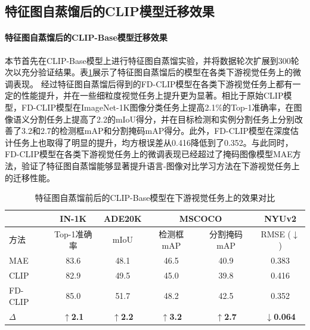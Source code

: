 \subsection{特征图自蒸馏后的CLIP模型迁移效果}
\label{sec:fd-exp-clip}
\paragraph{特征图自蒸馏后的CLIP-Base模型迁移效果} 本节首先在CLIP-Base模型上进行特征图自蒸馏实验，并将数据轮次扩展到300轮次以充分验证结果。表\ref{tab:fd-clip_FD}展示了特征图自蒸馏后的模型在各类下游视觉任务上的微调表现。
经过特征图自蒸馏后得到的FD-CLIP模型在各类下游视觉任务上都有一定的性能提升，并在一些细粒度视觉任务上提升更为显著。相比于原始CLIP模型，FD-CLIP模型在ImageNet-1K图像分类任务上提高2.1\%的Top-1准确率，在图像语义分割任务上提高了2.2的mIoU得分，并在目标检测和实例分割任务上分别改善了3.2和2.7的检测框mAP和分割掩码mAP得分。此外，FD-CLIP模型在深度估计任务上也取得了明显的提升，均方根误差从0.416降低到了0.352。与此同时，FD-CLIP模型在各类下游视觉任务上的微调表现已经超过了掩码图像模型MAE方法，验证了特征图自蒸馏能够显著提升语言-图像对比学习方法在下游视觉任务上的迁移性能。

\begin{table}
\caption{特征图自蒸馏前后的CLIP-Base模型在下游视觉任务上的效果对比
}
\centering
  \begin{tabular}{lccccc}
\toprule
   & IN-1K & ADE20K & \multicolumn{2}{c}{MSCOCO} & NYUv2 \\
   \midrule
方法    &   Top-1准确率 &  mIoU  & 检测框mAP & 分割掩码mAP & RMSE\scriptsize{ ($\downarrow$)}\\
  \midrule
  MAE & 83.6 & 48.1 & 46.5 & 40.9 & 0.383 \\

  \midrule
  
  CLIP & 82.9  & 49.5 & 45.0 & 39.8 & 0.416 \\
  FD-CLIP & 85.0  & 51.7 & 48.2 & 42.5 & 0.352 \\
  $\Delta$ & \textbf{$\uparrow$2.1}  &  \textbf{$\uparrow$2.2} & \textbf{$\uparrow$3.2} & \textbf{$\uparrow$2.7} & \textbf{$\downarrow$0.064}\\
\bottomrule
  \end{tabular}
\label{tab:fd-clip_FD}
\end{table}

